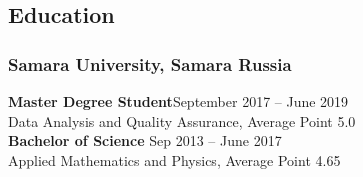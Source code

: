 \subsection*{Education}
    \subsubsection*{Samara University, Samara Russia}
    \textbf{Master Degree Student}\hfill \hfill September 2017 -- June 2019\\
    Data Analysis and Quality Assurance, Average Point 5.0\\
    \textbf{Bachelor of Science} \hfill Sep 2013 -- June 2017\\
    Applied Mathematics and Physics, Average Point 4.65